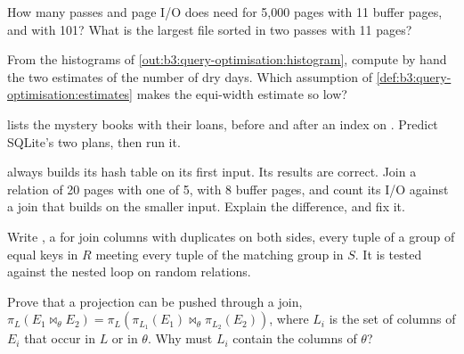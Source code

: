 \begin{exercise}[$\star$]\label{exo:b3:query-optimisation:2}
How many passes and page I/O does  need for 5,000 pages with 11 buffer pages, and with 101? What is the largest file sorted in two passes with 11 pages?
\end{exercise}

\begin{exercise}[$\star$]\label{exo:b3:query-optimisation:3}
From the histograms of \cref{out:b3:query-optimisation:histogram}, compute by hand the two estimates of the number of dry days. Which assumption of \cref{def:b3:query-optimisation:estimates} makes the equi-width estimate so low?
\end{exercise}

\begin{exercise}[$\star$]\label{exo:b3:query-optimisation:4}
 lists the mystery books with their loans, before and after an index on . Predict SQLite's two plans, then run it.
\end{exercise}

\begin{exercise}[$\star\star$]\label{exo:b3:query-optimisation:5}
 always builds its hash table on its first input. Its results are correct. Join a relation of 20 pages with one of 5, with 8 buffer pages, and count its I/O against a join that builds on the smaller input. Explain the difference, and fix it.
\end{exercise}

\begin{exercise}[$\star\star$]\label{exo:b3:query-optimisation:6}
Write , a  for join columns with duplicates on both sides, every tuple of a group of equal keys in $R$ meeting every tuple of the matching group in $S$. It is tested against the nested loop on random relations.
\end{exercise}

\begin{exercise}[$\star\star$]\label{exo:b3:query-optimisation:7}
Prove that a projection can be pushed through a join, $\pi_L(E_1 \bowtie_\theta E_2) = \pi_L(\pi_{L_1}(E_1) \bowtie_\theta \pi_{L_2}(E_2))$, where $L_i$ is the set of columns of $E_i$ that occur in $L$ or in $\theta$. Why must $L_i$ contain the columns of $\theta$?
\end{exercise}

